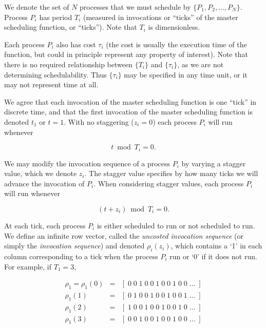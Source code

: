 We denote the set of $N$ processes that we must schedule
by $\{ P_1, P_2, \ldots , P_N \}$.  
Process $P_i$ has period $T_i$ (measured in invocations 
or ``ticks'' of
the master scheduling function, or ``ticks'').  Note that
$T_i$ is dimensionless.  

Each process $P_i$ also has cost
$\tau_i$ 
(the cost is usually the execution
time of the function, but could in principle represent any property of
interest).  Note that there is no required relationship between 
$\{ T_i \}$ and $\{ \tau_i \}$, as we are not determining schedulability.
Thus $\{ \tau_i \}$ may be specified in any time unit, or it may not
represent time at all.

We agree that each invocation of the master scheduling function
is one ``tick'' in discrete time, and that the first invocation
of the master scheduling function is denoted $t_1$ or $t=1$.
With no staggering ($z_i = 0$) each process $P_i$ will run
whenever

\begin{equation}
\label{eq:cdta0:spsi0:01}
t \bmod T_i = 0 .
\end{equation}

We may modify the invocation sequence of a process $P_i$ by 
varying a stagger value, which we denote $z_i$.  The stagger value
specifies by how many ticks we will advance the invocation of
$P_i$.  When considering stagger values, each process $P_i$ will
run whenever

\begin{equation}
\label{eq:cdta0:spsi0:02}
(t + z_i) \bmod T_i = 0 .
\end{equation}

At each tick, each process $P_i$ is either scheduled to run or not scheduled
to run.  We define an infinite row vector, called the \emph{uncosted invocation
sequence} (or simply the \emph{invocation sequence}) 
and denoted $\rho_i(z_i)$, which contains a `1' in each column corresponding
to a tick when the process $P_i$ run or `0' if it does not run.  For example,
if $T_1 = 3$, 

\begin{eqnarray}
\nonumber
\rho_1 = \rho_1(0) & = & [ \; 0 \; 0 \; 1 \; 0 \; 0 \; 1 \; 0 \; 0 \; 1 \; 0 \; 0 \; \ldots \; ] \\
\label{eq:cdta0:spsi0:03}
\rho_1(1) & = & [ \; 0 \; 1 \; 0 \; 0 \; 1 \; 0 \; 0 \; 1 \; 0 \; 0 \; 1 \; \ldots \; ] \\
\nonumber
\rho_1(2) & = & [ \; 1 \; 0 \; 0 \; 1 \; 0 \; 0 \; 1 \; 0 \; 0 \; 1 \; 0 \; \ldots \; ] \\
\nonumber
\rho_1(3) & = & [ \; 0 \; 0 \; 1 \; 0 \; 0 \; 1 \; 0 \; 0 \; 1 \; 0 \; 0 \; \ldots \; ]
\end{eqnarray}

